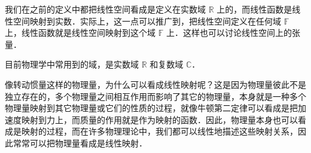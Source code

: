 我们在之前的定义中都把线性空间看成是定义在实数域 $\mathbb{R}$ 上的，而线性函数是线性空间映射到实数．实际上，这一点可以推广到，把线性空间定义在任何域 $\mathbb{F}$ 上，线性函数就是线性空间映射到这个域 $\mathbb{F}$ 上．这样也可以讨论线性空间上的张量．

目前物理学中常用到的域，是实数域 $\mathbb{R}$ 和复数域 $\mathbb{C}$．

像转动惯量这样的物理量，为什么可以看成线性映射呢？这是因为物理量彼此不是独立存在的，多个物理量之间相互作用而影响了其它的物理量，本身就是一种多个物理量映射到其它物理量或它们的性质的过程，就像牛顿第二定律可以看成是把加速度映射到力上，而质量的作用就是作为映射的函数．因此，物理量本身也可以看成是映射的过程，而在许多物理理论中，我们都可以线性地描述这些映射关系，因此常常可以把物理量看成是线性映射．
